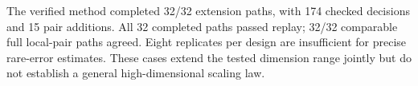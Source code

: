 The verified method completed 32/32 extension paths, with 174
checked decisions and 15 pair additions. All 32 completed paths
passed replay; 32/32 comparable full local-pair paths agreed.
Eight replicates per design are insufficient for precise rare-error estimates.
These cases extend the tested dimension range jointly but do not establish
a general high-dimensional scaling law.
